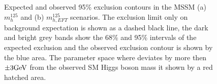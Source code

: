\begin{figure}[!hbtp]
\centering
\caption{Expected and observed 95\% \CL exclusion contours in the MSSM (a) $m_{h}^{125}$ and (b) $m_{h,EFT}^{125}$ scenarios. The exclusion limit only on background expectation is shown as a dashed black line, the dark and bright grey bands show the 68\% and 95\% intervals of the expected exclusion and the observed exclusion contour is shown by the blue area. The parameter space where \mh deviates by more then ${\pm}3\text{GeV}$ from the observed SM Higgs boson mass it shown by a red hatched area.
}
\label{fig:mssm_limits}
\end{figure}

